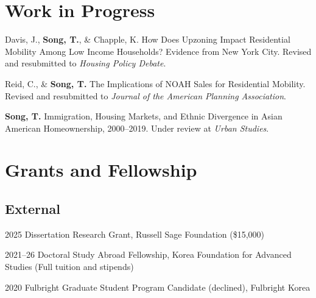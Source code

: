 \documentclass[11pt,letterpaper]{article}
\newcommand{\money}[1]{(\$#1)}
\newcommand{\term}[1]{(#1)}
\begin{document}
\section{Work in Progress}
\begin{subpoints}
\item Davis, J., \textbf{Song, T.}, \& Chapple, K. How Does Upzoning Impact Residential Mobility Among Low Income Households? Evidence from New York City. Revised and resubmitted to \emph{Housing Policy Debate}.
\item Reid, C., \& \textbf{Song, T.} The Implications of NOAH Sales for Residential Mobility. Revised and resubmitted to \emph{Journal of the American Planning Association}.
\item \textbf{Song, T.} Immigration, Housing Markets, and Ethnic Divergence in Asian American Homeownership, 2000–2019. Under review at \emph{Urban Studies}.
\end{subpoints}

\section{Grants and Fellowship}

\subsection{External}
\begin{tablist}
  \item[2025] \tab{}Dissertation Research Grant, Russell Sage Foundation \money{15,000}
  \item[2021–26] \tab{}Doctoral Study Abroad Fellowship, Korea Foundation for Advanced Studies \term{Full tuition and stipends}
  \item[2020] \tab{}Fulbright Graduate Student Program Candidate \term{declined}, Fulbright Korea
\end{tablist}
\end{document}
